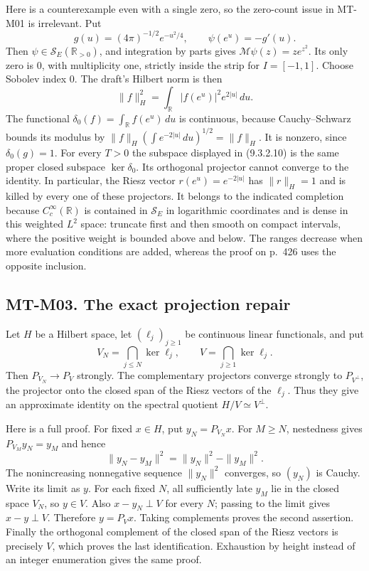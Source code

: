 \documentclass[11pt,a4paper]{article}
\begin{document}
Here is a counterexample even with a single zero, so the zero-count issue
in MT-M01 is irrelevant.  Put
\[
 g(u)=(4\pi)^{-1/2}e^{-u^2/4},\qquad
 \psi(e^u)=-g'(u).
\]
Then $\psi\in\mathcal S_E(\mathbb R_{>0})$, and integration by parts gives
$\mathcal M\psi(z)=z e^{z^2}$.  Its only zero is $0$, with multiplicity one,
strictly inside the strip for $I=[-1,1]$.  Choose Sobolev index $0$.
The draft's Hilbert norm is then
\[
 \|f\|_H^2=\int_{\mathbb R}|f(e^u)|^2e^{2|u|}\,du.
\]
The functional $\delta_0(f)=\int_{\mathbb R}f(e^u)\,du$ is continuous,
because Cauchy--Schwarz bounds its modulus by
$\|f\|_H(\int e^{-2|u|}\,du)^{1/2}=\|f\|_H$.
It is nonzero, since $\delta_0(g)=1$.  For every $T>0$ the subspace displayed
in (9.3.2.10) is the same proper closed subspace $\ker\delta_0$.
Its orthogonal projector cannot converge to the identity.  In particular,
the Riesz vector $r(e^u)=e^{-2|u|}$ has $\|r\|_H=1$ and is killed by every
one of these projectors.  It belongs to the indicated completion because
$C_c^\infty(\mathbb R)$ is contained in $\mathcal S_E$ in logarithmic
coordinates and is dense in this weighted $L^2$ space: truncate first and
then smooth on compact intervals, where the positive weight is bounded
above and below.  The ranges decrease when more evaluation
conditions are added, whereas the proof on p.~426 uses the opposite
inclusion.

\subsection*{MT-M03. The exact projection repair}
Let $H$ be a Hilbert space, let $(\ell_j)_{j\ge1}$ be continuous linear
functionals, and put
\[
 V_N=\bigcap_{j\le N}\ker\ell_j,\qquad V=\bigcap_{j\ge1}\ker\ell_j.
\]
Then $P_{V_N}\to P_V$ strongly.  The complementary projectors converge
strongly to $P_{V^\perp}$, the projector onto the closed span of the Riesz
vectors of the $\ell_j$.  Thus they give an approximate identity on the
spectral quotient $H/V\simeq V^\perp$.

Here is a full proof.  For fixed $x\in H$, put $y_N=P_{V_N}x$.  For
$M\ge N$, nestedness gives $P_{V_M}y_N=y_M$ and hence
\[
 \|y_N-y_M\|^2=\|y_N\|^2-\|y_M\|^2.
\]
The nonincreasing nonnegative sequence $\|y_N\|^2$ converges, so $(y_N)$ is
Cauchy.  Write its limit as $y$.  For each fixed $N$, all sufficiently late
$y_M$ lie in the closed space $V_N$, so $y\in V$.  Also
$x-y_N\perp V$ for every $N$; passing to the limit gives $x-y\perp V$.
Therefore $y=P_Vx$.  Taking complements proves the second assertion.
Finally the orthogonal complement of the closed span of the Riesz vectors
is precisely $V$, which proves the last identification.  Exhaustion by
height instead of an integer enumeration gives the same proof.
\end{document}
